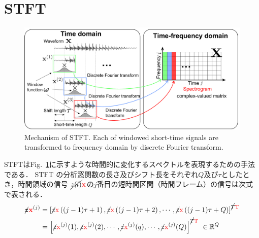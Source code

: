 \section{STFT}
\label{sec:stft}
\begin{figure}[t]
    \begin{center}
        \includegraphics[width=0.95\columnwidth]{figures/stft.pdf}
    \end{center}
    \vspace{-8pt}
	\caption{Mechanism of STFT. Each of windowed short-time signals are transformed to frequency domain by discrete Fourier transform.}
	\label{fig:stft}
\end{figure}
STFTはFig.~\ref{fig:stft}に示すような時間的に変化するスペクトルを表現するための手法である．
STFT の分析窓関数の長さ及びシフト長をそれぞれ$Q$及び$\tau$としたとき，時間領域の信号
$\cancel{z(l)} \textcolor{red}{\mathbf{x}}$の$j$番目の短時間区間（時間フレーム）の信号は次式で表される．
\begin{align}
    \bm{\cancel{z} \textcolor{red}{\mathbf{x}}}^{(j)} &= \left[\cancel{z} \textcolor{red}{\mathrm{x}}\left((j-1)\tau+1\right), \cancel{z} \textcolor{red}{\mathrm{x}}\left((j-1)\tau+2\right), \cdots , \cancel{z} \textcolor{red}{\mathrm{x}}\left((j-1)\tau+Q\right) \right]^{\cancel{T} \textcolor{red}{\mathrm{T}}}\\
    &= \left[
    \cancel{z} \textcolor{red}{\mathrm{x}}^{(j)}(1),\cancel{z} \textcolor{red}{\mathrm{x}}^{(j)}(2),\cdots , \cancel{z} \textcolor{red}{\mathrm{x}}^{(j)}(q), \cdots , \cancel{z} \textcolor{red}{\mathrm{x}}^{(j)}(Q)
    \right]^{\cancel{T} \textcolor{red}{\mathrm{T}}}~\in \mathbb{R}^{Q}
\end{align}
